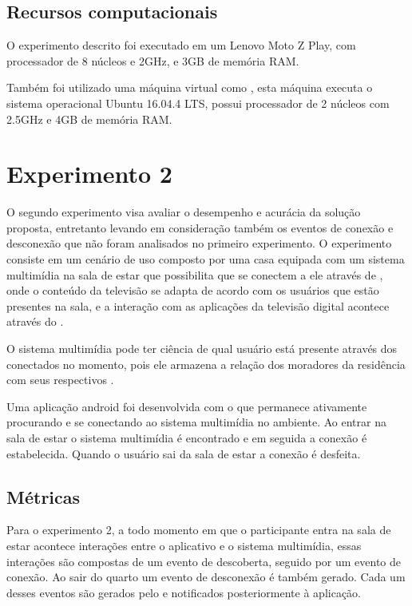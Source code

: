 \subsection{Recursos computacionais}

O experimento descrito foi executado em um \smartphone Lenovo Moto Z Play, com processador de 8 núcleos e 2GHz, e 3GB de memória RAM.

Também foi utilizado uma máquina virtual como \broker \mqtt, esta máquina executa o sistema operacional Ubuntu 16.04.4 LTS, possui processador de 2 núcleos com 2.5GHz e 4GB de memória RAM.

\section{Experimento 2}

O segundo experimento visa avaliar o desempenho e acurácia da solução proposta, entretanto levando em consideração também os eventos de conexão e desconexão que não foram analisados no primeiro experimento. O experimento consiste em um cenário de uso composto por uma casa equipada com um sistema multimídia na sala de estar que possibilita que \smartphones se conectem a ele através de \bluetooth, onde o conteúdo da televisão se adapta de acordo com os usuários que estão presentes na sala, e a interação com as aplicações da televisão digital acontece através do \smartphone.

O sistema multimídia pode ter ciência de qual usuário está presente através dos \smartphones conectados no momento, pois ele armazena a relação dos moradores da residência com seus respectivos \smartphones.

Uma aplicação android foi desenvolvida com o \middleware \mhubcddl que permanece ativamente procurando e se conectando ao sistema multimídia no ambiente. Ao entrar na sala de estar o sistema multimídia é encontrado e em seguida a conexão é estabelecida. Quando o usuário sai da sala de estar a conexão é desfeita. 

\subsection{Métricas}

Para o experimento 2, a todo momento em que o participante entra na sala de estar acontece interações entre o aplicativo e o sistema multimídia, essas interações são compostas de um evento de descoberta, seguido por um evento de conexão. Ao sair do quarto um evento de desconexão é também gerado. Cada um desses eventos são gerados pelo \stwopa e notificados posteriormente à aplicação.

